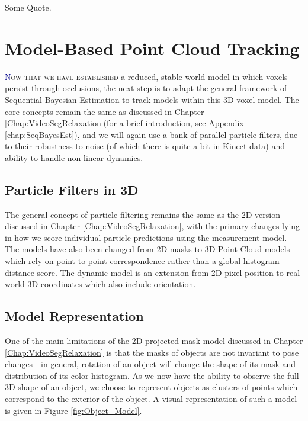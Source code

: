 \begin{savequote}[75mm]
Some Quote.
\end{savequote}

\chapter{Model-Based Point Cloud Tracking}
\label{Chap:ModelBasedTracking}
\lettrine[lines=3, loversize=0.3]{\textcolor{DarkBlue}N}{ow that we have established} a reduced, stable world model in which voxels persist through occlusions, the next step is to adapt the general framework of Sequential Bayesian Estimation to track models within this 3D voxel model. The core concepts remain the same as discussed in Chapter \ref{Chap:VideoSegRelaxation}(for a brief introduction, see Appendix \ref{chap:SeqBayesEst}), and we will again use a bank of parallel particle filters, due to their robustness to noise (of which there is quite a bit in Kinect data) and ability to handle non-linear dynamics.

\section{Particle Filters in 3D}
The general concept of particle filtering remains the same as the 2D version discussed in Chapter \ref{Chap:VideoSegRelaxation}, with the primary changes lying in how we score individual particle predictions using the measurement model. The models have also been changed from 2D masks to 3D Point Cloud models which rely on point to point correspondence rather than a global histogram distance score. The dynamic model is an extension from 2D pixel position to real-world 3D coordinates which also include orientation. 

\section{Model Representation}
One of the main limitations of the 2D projected mask model discussed in Chapter \ref{Chap:VideoSegRelaxation} is that the masks of objects are not invariant to pose changes - in general, rotation of an object will change the shape of its mask and distribution of its color histogram. As we now have the ability to observe the full 3D shape of an object, we choose to represent objects as clusters of points which correspond to the exterior of the object. A visual representation of such a model is given in Figure \ref{fig:Object_Model}.

